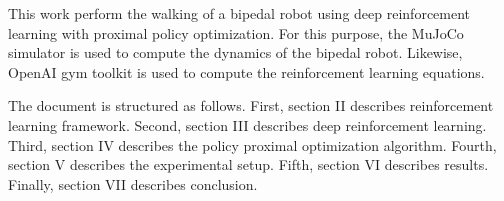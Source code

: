 This work perform the walking of a bipedal robot using deep reinforcement learning with proximal policy optimization. For this purpose, the MuJoCo simulator is used to compute the dynamics of the bipedal robot. Likewise, OpenAI gym toolkit is used to compute the reinforcement learning equations.

The document is structured as follows. First, section II describes reinforcement learning framework. Second, section III describes deep reinforcement learning. Third, section IV describes the policy proximal optimization algorithm. Fourth, section V describes the experimental setup. Fifth, section VI describes results. Finally, section VII describes conclusion.



